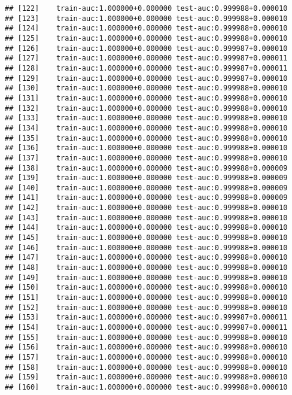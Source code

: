 \documentclass[11pt,]{article}
\begin{document}
\begin{verbatim}
## [122]    train-auc:1.000000+0.000000 test-auc:0.999988+0.000010 
## [123]    train-auc:1.000000+0.000000 test-auc:0.999988+0.000010 
## [124]    train-auc:1.000000+0.000000 test-auc:0.999988+0.000010 
## [125]    train-auc:1.000000+0.000000 test-auc:0.999988+0.000010 
## [126]    train-auc:1.000000+0.000000 test-auc:0.999987+0.000010 
## [127]    train-auc:1.000000+0.000000 test-auc:0.999987+0.000011 
## [128]    train-auc:1.000000+0.000000 test-auc:0.999987+0.000011 
## [129]    train-auc:1.000000+0.000000 test-auc:0.999987+0.000010 
## [130]    train-auc:1.000000+0.000000 test-auc:0.999988+0.000010 
## [131]    train-auc:1.000000+0.000000 test-auc:0.999988+0.000010 
## [132]    train-auc:1.000000+0.000000 test-auc:0.999988+0.000010 
## [133]    train-auc:1.000000+0.000000 test-auc:0.999988+0.000010 
## [134]    train-auc:1.000000+0.000000 test-auc:0.999988+0.000010 
## [135]    train-auc:1.000000+0.000000 test-auc:0.999988+0.000010 
## [136]    train-auc:1.000000+0.000000 test-auc:0.999988+0.000010 
## [137]    train-auc:1.000000+0.000000 test-auc:0.999988+0.000010 
## [138]    train-auc:1.000000+0.000000 test-auc:0.999988+0.000009 
## [139]    train-auc:1.000000+0.000000 test-auc:0.999988+0.000009 
## [140]    train-auc:1.000000+0.000000 test-auc:0.999988+0.000009 
## [141]    train-auc:1.000000+0.000000 test-auc:0.999988+0.000009 
## [142]    train-auc:1.000000+0.000000 test-auc:0.999988+0.000010 
## [143]    train-auc:1.000000+0.000000 test-auc:0.999988+0.000010 
## [144]    train-auc:1.000000+0.000000 test-auc:0.999988+0.000010 
## [145]    train-auc:1.000000+0.000000 test-auc:0.999988+0.000010 
## [146]    train-auc:1.000000+0.000000 test-auc:0.999988+0.000010 
## [147]    train-auc:1.000000+0.000000 test-auc:0.999988+0.000010 
## [148]    train-auc:1.000000+0.000000 test-auc:0.999988+0.000010 
## [149]    train-auc:1.000000+0.000000 test-auc:0.999988+0.000010 
## [150]    train-auc:1.000000+0.000000 test-auc:0.999988+0.000010 
## [151]    train-auc:1.000000+0.000000 test-auc:0.999988+0.000010 
## [152]    train-auc:1.000000+0.000000 test-auc:0.999988+0.000010 
## [153]    train-auc:1.000000+0.000000 test-auc:0.999987+0.000011 
## [154]    train-auc:1.000000+0.000000 test-auc:0.999987+0.000011 
## [155]    train-auc:1.000000+0.000000 test-auc:0.999988+0.000010 
## [156]    train-auc:1.000000+0.000000 test-auc:0.999988+0.000010 
## [157]    train-auc:1.000000+0.000000 test-auc:0.999988+0.000010 
## [158]    train-auc:1.000000+0.000000 test-auc:0.999988+0.000010 
## [159]    train-auc:1.000000+0.000000 test-auc:0.999988+0.000010 
## [160]    train-auc:1.000000+0.000000 test-auc:0.999988+0.000010 

\end{verbatim}
\end{document}
